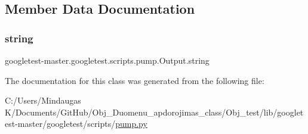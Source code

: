 \subsection{Member Data Documentation}
\mbox{\label{classgoogletest-master_1_1googletest_1_1scripts_1_1pump_1_1_output_af0a3e3af02acadd710055b9a238b2898}} 
\subsubsection{\texorpdfstring{string}{string}}
{\footnotesize\ttfamily googletest-\/master.\+googletest.\+scripts.\+pump.\+Output.\+string}



The documentation for this class was generated from the following file\+:\begin{DoxyCompactItemize}
\item 
C\+:/\+Users/\+Mindaugas K/\+Documents/\+Git\+Hub/\+Obj\+\_\+\+Duomenu\+\_\+apdorojimas\+\_\+class/\+Obj\+\_\+test/lib/googletest-\/master/googletest/scripts/\mbox{\hyperlink{_obj__test_2lib_2googletest-master_2googletest_2scripts_2pump_8py}{pump.\+py}}\end{DoxyCompactItemize}
